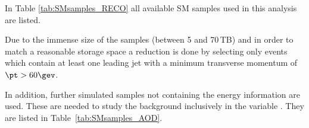 In Table \ref{tab:SMsamples_RECO} all available SM samples used in this analysis are listed.
\renewcommand{\arraystretch}{1.5}
\begin{table}[!b]
\centering
\caption{Available Standard Model background samples containing $\Delta E/\Delta x$ information which are used for background estimation studies.}
\label{tab:SMsamples_RECO}
\end{table}  
Due to the immense size of the samples (between 5 and 70\,TB) and in order to match a reasonable storage space a reduction is done by selecting only events which contain at least one leading jet with a minimum transverse momentum of $\pt>60\gev$.

In addition, further simulated samples not containing the energy information are used.
These are needed to study the background inclusively in the variable \ias.
They are listed in Table~\ref{tab:SMsamples_AOD}.
\renewcommand{\arraystretch}{1.5}
\begin{table}[!t]
\centering
\caption{Standard Model background samples without $\Delta E/\Delta x$ information.}
\label{tab:SMsamples_AOD}
\end{table}  

